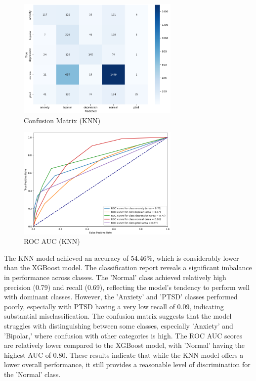 \vspace{0.25em}

\begin{figure}[h!]  
    \centering
    \includegraphics[width=0.7\textwidth]{Images/KNN Confusion Matrix.png}  
    \caption{Confusion Matrix (KNN)}
    \label{KNNCM}  %
\end{figure}

\begin{figure}[h!]  
    \centering
    \includegraphics[width=0.7\textwidth]{Images/KNN ROC.png}  
    \caption{ROC AUC (KNN)}
    \label{KNnROC}  %
\end{figure}

\noindent
The KNN model achieved an accuracy of 54.46\%, which is considerably lower than the XGBoost model. The classification report reveals a significant imbalance in performance across classes. The 'Normal' class achieved relatively high precision (0.79) and recall (0.69), reflecting the model's tendency to perform well with dominant classes. However, the 'Anxiety' and 'PTSD' classes performed poorly, especially with PTSD having a very low recall of 0.09, indicating substantial misclassification. The confusion matrix suggests that the model struggles with distinguishing between some classes, especially 'Anxiety' and 'Bipolar,' where confusion with other categories is high. The ROC AUC scores are relatively lower compared to the XGBoost model, with 'Normal' having the highest AUC of 0.80. These results indicate that while the KNN model offers a lower overall performance, it still provides a reasonable level of discrimination for the 'Normal' class.

